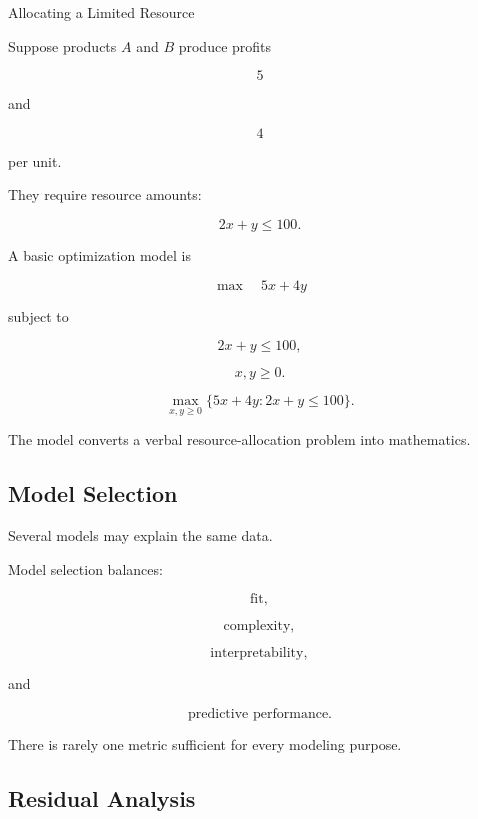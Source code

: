 \begin{workedexamplebox}{Allocating a Limited Resource}

Suppose products \(A\) and \(B\) produce profits

\[
5
\]

and

\[
4
\]

per unit.

They require resource amounts:

\[
2x+y\leq100.
\]

A basic optimization model is

\[
\max
\quad
5x+4y
\]

subject to

\[
2x+y\leq100,
\]

\[
x,y\geq0.
\]

\begin{answerbox}
\[
\boxed{
\max_{x,y\geq0}
\{
5x+4y:
2x+y\leq100
\}.
}
\]
\end{answerbox}

The model converts a verbal resource-allocation problem into mathematics.

\end{workedexamplebox}

\subsection{Model Selection}
\label{subsec:model-selection}

Several models may explain the same data.

Model selection balances:

\[
\boxed{
\text{fit},
}
\]

\[
\boxed{
\text{complexity},
}
\]

\[
\boxed{
\text{interpretability},
}
\]

and

\[
\boxed{
\text{predictive performance}.
}
\]

There is rarely one metric sufficient for every modeling purpose.

\subsection{Residual Analysis}
\label{subsec:model-residual-analysis}

